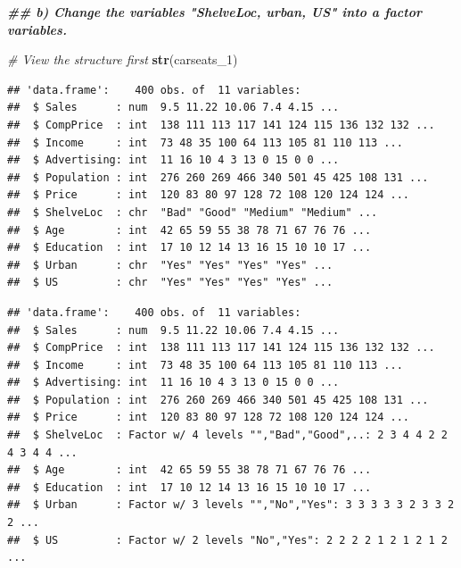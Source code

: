 \documentclass[
]{article}
\newenvironment{Shaded}{\begin{snugshade}}{\end{snugshade}}
\newcommand{\CommentTok}[1]{\textcolor[rgb]{0.56,0.35,0.01}{\textit{#1}}}
\newcommand{\DocumentationTok}[1]{\textcolor[rgb]{0.56,0.35,0.01}{\textbf{\textit{#1}}}}
\newcommand{\FunctionTok}[1]{\textcolor[rgb]{0.13,0.29,0.53}{\textbf{#1}}}
\newcommand{\NormalTok}[1]{#1}
\newcommand{\OtherTok}[1]{\textcolor[rgb]{0.56,0.35,0.01}{#1}}
\newcommand{\SpecialCharTok}[1]{\textcolor[rgb]{0.81,0.36,0.00}{\textbf{#1}}}
\begin{document}
\begin{Shaded}
\begin{Highlighting}[]
\DocumentationTok{\#\# b)  Change the variables "ShelveLoc, urban, US" into a factor variables.}

    \CommentTok{\# View the structure first}
  \FunctionTok{str}\NormalTok{(carseats\_1)}
\end{Highlighting}
\end{Shaded}

\begin{verbatim}
## 'data.frame':    400 obs. of  11 variables:
##  $ Sales      : num  9.5 11.22 10.06 7.4 4.15 ...
##  $ CompPrice  : int  138 111 113 117 141 124 115 136 132 132 ...
##  $ Income     : int  73 48 35 100 64 113 105 81 110 113 ...
##  $ Advertising: int  11 16 10 4 3 13 0 15 0 0 ...
##  $ Population : int  276 260 269 466 340 501 45 425 108 131 ...
##  $ Price      : int  120 83 80 97 128 72 108 120 124 124 ...
##  $ ShelveLoc  : chr  "Bad" "Good" "Medium" "Medium" ...
##  $ Age        : int  42 65 59 55 38 78 71 67 76 76 ...
##  $ Education  : int  17 10 12 14 13 16 15 10 10 17 ...
##  $ Urban      : chr  "Yes" "Yes" "Yes" "Yes" ...
##  $ US         : chr  "Yes" "Yes" "Yes" "Yes" ...
\end{verbatim}

\begin{Shaded}
\end{Shaded}

\begin{verbatim}
## 'data.frame':    400 obs. of  11 variables:
##  $ Sales      : num  9.5 11.22 10.06 7.4 4.15 ...
##  $ CompPrice  : int  138 111 113 117 141 124 115 136 132 132 ...
##  $ Income     : int  73 48 35 100 64 113 105 81 110 113 ...
##  $ Advertising: int  11 16 10 4 3 13 0 15 0 0 ...
##  $ Population : int  276 260 269 466 340 501 45 425 108 131 ...
##  $ Price      : int  120 83 80 97 128 72 108 120 124 124 ...
##  $ ShelveLoc  : Factor w/ 4 levels "","Bad","Good",..: 2 3 4 4 2 2 4 3 4 4 ...
##  $ Age        : int  42 65 59 55 38 78 71 67 76 76 ...
##  $ Education  : int  17 10 12 14 13 16 15 10 10 17 ...
##  $ Urban      : Factor w/ 3 levels "","No","Yes": 3 3 3 3 3 2 3 3 2 2 ...
##  $ US         : Factor w/ 2 levels "No","Yes": 2 2 2 2 1 2 1 2 1 2 ...
\end{verbatim}
\end{document}
